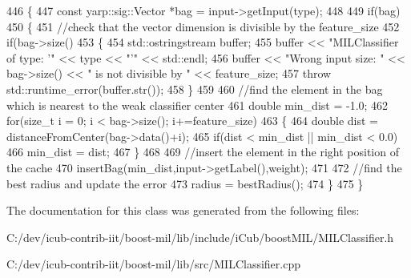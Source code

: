 \begin{DoxyCode}
446 \{
447     \textcolor{keyword}{const} yarp::sig::Vector *bag = input->getInput(type);
448 
449     \textcolor{keywordflow}{if}(bag)
450     \{
451         \textcolor{comment}{//check that the vector dimension is divisible by the feature\_size}
452         \textcolor{keywordflow}{if}(bag->size()%
453         \{
454             std::ostringstream buffer;
455             buffer << \textcolor{stringliteral}{"MILClassifier of type: '"} << type << \textcolor{stringliteral}{"'"} << std::endl;
456             buffer << \textcolor{stringliteral}{"Wrong input size: "} << bag->size() << \textcolor{stringliteral}{" is not divisible by "} << feature\_size;
457             \textcolor{keywordflow}{throw} std::runtime\_error(buffer.str());
458         \}
459 
460         \textcolor{comment}{//find the element in the bag which is nearest to the weak classifier center}
461         \textcolor{keywordtype}{double} min\_dist = -1.0;
462         \textcolor{keywordflow}{for}(\textcolor{keywordtype}{size\_t} i = 0; i < bag->size(); i+=feature\_size)
463         \{
464             \textcolor{keywordtype}{double} dist = distanceFromCenter(bag->data()+i);
465             \textcolor{keywordflow}{if}(dist < min\_dist || min\_dist < 0.0)
466                 min\_dist = dist;
467         \}
468 
469         \textcolor{comment}{//insert the element in the right position of the cache}
470         insertBag(min\_dist,input->getLabel(),weight);
471 
472         \textcolor{comment}{//find the best radius and update the error}
473         radius = bestRadius();
474     \}
475 \}
\end{DoxyCode}


The documentation for this class was generated from the following files\+:\begin{DoxyCompactItemize}
\item 
C\+:/dev/icub-\/contrib-\/iit/boost-\/mil/lib/include/i\+Cub/boost\+M\+I\+L/M\+I\+L\+Classifier.\+h\item 
C\+:/dev/icub-\/contrib-\/iit/boost-\/mil/lib/src/M\+I\+L\+Classifier.\+cpp\end{DoxyCompactItemize}

